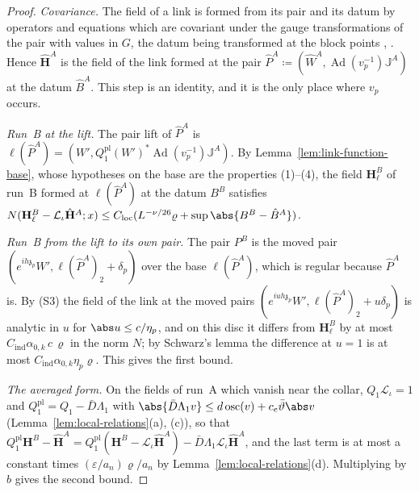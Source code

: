 \begin{proof}
\emph{Covariance.} The field of a link is formed from its pair and its datum by operators and equations which are covariant under the gauge transformations of the pair with values in $G$, the datum being transformed at the block points \cite[(181), p.~307]{BalabanVAR}, \cite[p.~262, (iv)]{BalabanRG1}. Hence $\hat{\mathbf H}^A$ is the field of the link formed at the pair $\hat P^A \coloneqq (\hat W^A, \operatorname{Ad}(v_p^{-1})\mathbb J^A)$ at the datum $\hat B^A$. This step is an identity, and it is the only place where $v_p$ occurs.

\emph{Run~B at the lift.} The pair lift of $\hat P^A$ is $\ell(\hat P^A) = (W', Q^{\mathrm{pl}}_1(W')^*\operatorname{Ad}(v_p^{-1})\mathbb J^A)$. By Lemma~\ref{lem:link-function-base}, whose hypotheses on the base are the properties (1)--(4), the field $\mathbf H^B_\ell$ of run~B formed at $\ell(\hat P^A)$ at the datum $B^B$ satisfies $N(\mathbf H^B_\ell - \mathcal L_\iota\hat{\mathbf H}^A; x) \leq C_{\mathrm{loc}}(L^{-\nu/26}\varrho + \sup\abs{B^B - \hat B^A})$.

\emph{Run~B from the lift to its own pair.} The pair $P^B$ is the moved pair $(e^{ih\mathfrak z_p}W', \ell(\hat P^A)_2 + \delta_p)$ over the base $\ell(\hat P^A)$, which is regular because $\hat P^A$ is. By (S3) the field of the link at the moved pairs $(e^{iuh\mathfrak z_p}W', \ell(\hat P^A)_2 + u\delta_p)$ is analytic in $u$ for $\abs u \leq c/\eta_p$, and on this disc it differs from $\mathbf H^B_\ell$ by at most $C_{\mathrm{ind}}\alpha_{0,k}\,c\,\varrho$ in the norm $N$; by Schwarz's lemma the difference at $u = 1$ is at most $C_{\mathrm{ind}}\alpha_{0,k}\eta_p\varrho$. This gives the first bound.

\emph{The averaged form.} On the fields of run~A which vanish near the collar, $Q_1\mathcal L_\iota = 1$ and $Q^{\mathrm{pl}}_1 = Q_1 - \bar D\Lambda_1$ with $\abs{\bar D\Lambda_1v} \leq d\operatorname{osc}(v) + c_e\bar\vartheta\abs v$ (Lemma~\ref{lem:local-relations}(a), (c)), so that $Q^{\mathrm{pl}}_1\mathbf H^B - \hat{\mathbf H}^A = Q^{\mathrm{pl}}_1(\mathbf H^B - \mathcal L_\iota\hat{\mathbf H}^A) - \bar D\Lambda_1\mathcal L_\iota\hat{\mathbf H}^A$, and the last term is at most a constant times $(\varepsilon/a_n)\varrho/a_n$ by Lemma~\ref{lem:local-relations}(d). Multiplying by $b$ gives the second bound.


\end{proof}
